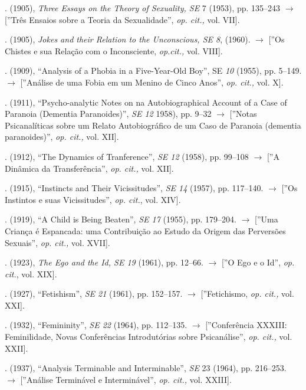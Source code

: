 \begin{description}
. (1905), \textit{Three Essays on the Theory of Sexuality, SE
}7\textit{ } (1953), pp. 135--243 {$\bm{\rightarrow}$} [''Três Ensaios sobre a Teoria da
Sexualidade'', \textit{op. cit., }vol. VII].

. (1905), \textit{Jokes and their Relation to the Unconscious,
SE 8}, (1960). {$\bm{\rightarrow}$} [''Os Chistes e sua Relação com o Inconsciente,
\textit{op.cit., }vol. VIII].

. (1909), ``Analysis of a Phobia in a Five-Year-Old
Boy'', SE \textit{10} (1955), pp. 5--149. {$\bm{\rightarrow}$} [''Análise de
uma Fobia em um Menino de Cinco Anos'', \textit{op. cit., }vol. X].

. (1911), ``Psycho-analytic Notes on na
Autobiographical Account of a Case of Paranoia (Dementia
Paranoides)'', \textit{SE 12 }1958), pp. 9--32 {$\bm{\rightarrow}$} [''Notas
Psicanalíticas sobre um Relato Autobiográfico de um Caso de Paranoia (dementia
paranoides)'', \textit{op. cit., }vol. XII].

. (1912), ``The Dynamics of
Tranference'', \textit{SE 12 }(1958), pp. 99--108 {$\bm{\rightarrow}$} [''A
Dinâmica da Transferência'', \textit{op. cit., }vol. XII].

. (1915), ``Instincts and Their
Vicissitudes'', \textit{SE 14 }(1957), pp. 117--140.
{$\bm{\rightarrow}$} [''Os Instintos e suas Vicissitudes'', \textit{op. cit.}, vol. XIV].

. (1919), ``A Child is Being Beaten'',
\textit{SE 17 }(1955), pp. 179--204. {$\bm{\rightarrow}$} [''Uma Criança
é Espancada: uma Contribuição ao Estudo da Origem das Perversões
Sexuais'', \textit{op. cit., }vol. XVII].

. (1923), \textit{The Ego and the Id, SE 19 }(1961), pp. 12--66.
{$\bm{\rightarrow}$} [''O Ego e o Id'', \textit{op. cit.}, vol. XIX].

. (1927), ``Fetishism'', \textit{SE 21
}(1961), pp. 152--157. {$\bm{\rightarrow}$} [''Fetichismo, \textit{op. cit., }vol. XXI].

. (1932), ``Femininity'', \textit{SE
22 }(1964), pp. 112--135. {$\bm{\rightarrow}$} [''Conferência XXXIII: Feminilidade, Novas
Conferências Introdutórias sobre Psicanálise'', \textit{op. cit.,
}vol. XXII].

. (1937), ``Analysis Terminable and
Interminable'', \textit{SE }23 (1964), pp. 216--253.
{$\bm{\rightarrow}$} [''Análise Terminável e Interminável'', \textit{op.
cit., }vol. XXIII].


\end{description}
